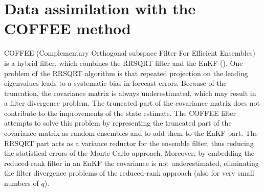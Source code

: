 \section{Data assimilation  with the COFFEE method}

COFFEE (Complementary Orthogonal subspace Filter For Efficient Ensembles) is a
hybrid filter, which combines the RRSQRT filter and the EnKF
(\cite{Heemink2001}). One problem of the RRSQRT algorithm is that repeated
projection on the leading eigenvalues leads to a systematic bias in forecast
errors. Because of the truncation, the covariance matrix is always
underestimated, which may result in a filter divergence problem. The truncated
part of the covariance matrix does not contribute to the improvements of the
state estimate. The COFFEE filter attempts to solve this problem by
representing the truncated part of the covariance matrix as random ensembles
and to add them to the EnKF part. The RRSQRT part acts as a variance reductor
for the ensemble filter, thus reducing the statistical errors of the Monte
Carlo approach. Moreover, by embedding the reduced-rank filter in an EnKF the
covariance is not underestimated, eliminating the filter divergence problems of
the reduced-rank approach (also for very small numbers of $q$).

